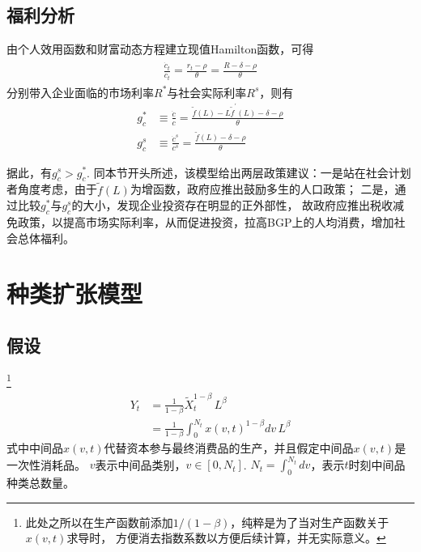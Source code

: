 \documentclass[cn,normal,11pt,black]{elegantnote}
\begin{document}
\begin{corollary}
    \subsection{福利分析}
    由个人效用函数和财富动态方程建立现值Hamilton函数，可得
    \begin{align}
    \begin{aligned}
    \frac{\dot{c}_t}{c_t} = \frac{r_t -  \rho}{\theta}  = \frac{R - \delta -  \rho}{\theta}
    \end{aligned}
    \end{align}
    分别带入企业面临的市场利率$R^*$与社会实际利率$R^s$，则有
    \begin{align}
        g_c^* & \equiv \frac{\dot{c}}{c} = \frac{ \tilde f(L) - L\tilde f^\prime(L) -\delta - \rho}{\theta} \\
        g_c^s & \equiv \frac{\dot{c}^s}{c^s} = \frac{ \tilde f(L) -\delta - \rho}{\theta}
    \end{align}

    据此，有$g_c^s > g_c^*$.
    同本节开头所述，该模型给出两层政策建议：一是站在社会计划者角度考虑，由于$\tilde{f}(L)$为增函数，政府应推出鼓励多生的人口政策；
    二是，通过比较$g^*_c$与$g^s_c$的大小，发现企业投资存在明显的正外部性，
    故政府应推出税收减免政策，以提高市场实际利率，从而促进投资，拉高BGP上的人均消费，增加社会总体福利。
\end{corollary}

\section{种类扩张模型}

\subsection{假设}
\begin{definition}[最终品生产函数]
    \footnote{此处之所以在生产函数前添加$1/(1-\beta)$，纯粹是为了当对生产函数关于$x(v,t)$求导时，
        方便消去指数系数以方便后续计算，并无实际意义。}
    \begin{align}
        Y_{t} & = \frac{1}{1-\beta} \widetilde{X}_t^{1-\beta} \, L^\beta \\
              & = \frac{1}{1-\beta} \int_0^{N_t} x(v,t)^{1-\beta} dv \, L^\beta
    \end{align}  
    式中中间品$x(v,t)$代替资本参与最终消费品的生产，并且假定中间品$x(v,t)$是一次性消耗品。
    $v$表示中间品类别，$v \in [0,N_t]$.
    $N_t = \int_0^{N_t} dv$，表示$t$时刻中间品种类总数量。
\end{definition}
\end{document}
